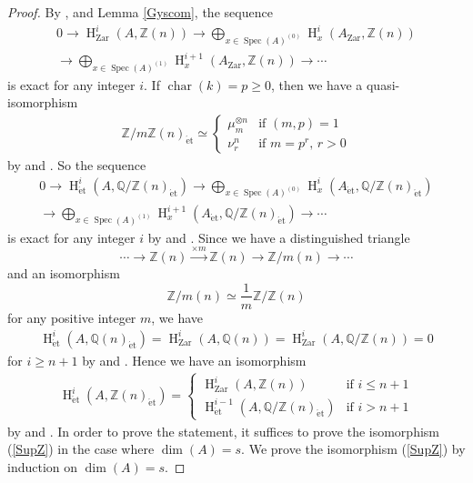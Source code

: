 \documentclass{article}
\newcommand{\spec}{\operatorname{Spec}}
\newcommand{\et}{\mathrm{\acute{e}t}}
\newcommand{\Zar}{\mathrm{Zar}}
\newcommand{\HO}{\operatorname{H}}
\begin{document}
%
\begin{proof}\upshape
By \cite[p.299, Theorem (10.1)]{B}, 
\cite[p.779, Theorem 3.2.b)]{Ge} and Lemma \ref{Gyscom},
the sequence
%
\begin{align}\label{GZarZ}
0
\to
\HO^{i}_{\Zar}(A, \mathbb{Z}(n))
\to
\displaystyle\bigoplus_{x\in \spec(A)^{(0)}}
\HO^{i}_{x}(A_{\Zar},
\mathbb{Z}(n)) \nonumber
\\
\to
\displaystyle\bigoplus_{x\in \spec(A)^{(1)}}
\HO^{i+1}_{x}(
A_{\Zar},
\mathbb{Z}(n)
) 
\to \cdots
\end{align}
%
is exact for any integer $i$.
If $\operatorname{char}(k)=p\geq 0$,
then we have a quasi-isomorphism
%
\begin{align*}
\mathbb{Z}/m\mathbb{Z}(n)_{\et}
\simeq
\left\{
%
\begin{array}{ll}
\mu_{m}^{\otimes n}
&  \textrm{if $(m, p)=1$}  \\ [5pt]
\nu_{r}^{n}
&  \textrm{if $m=p^{r}$, $r>0$}
\end{array}
%
\right.
\end{align*}
% 
by \cite[p.774, Theorem 1.2.4]{Ge} and
\cite[p.491, Theorem 8.3]{Ge-L}. 
So the sequence
%
\begin{align}\label{GetQZ}
0
\to
\HO^{i}_{\et}(A, \mathbb{Q}/\mathbb{Z}(n)_{\et}
)
\to
\displaystyle\bigoplus_{x\in \spec(A)^{(0)}}
\HO^{i}_{x}(A_{\et},
\mathbb{Q}/\mathbb{Z}(n)_{\et}
)  \nonumber
\\
\to 
\displaystyle\bigoplus_{x\in \spec(A)^{(1)}}
\HO^{i+1}_{x}(
A_{\et},
\mathbb{Q}/\mathbb{Z}(n)_{\et}
)  
\to \cdots
\end{align}
%
is exact for any integer $i$
by
\cite[Corollary 2.2.2]{C-H-K} and
\cite[p.600, Theorem 4.1]{Sh}.
Since we have
a distinguished triangle
%
\begin{equation*}
\cdots 
\to
\mathbb{Z}(n)
\xrightarrow{\times m}
\mathbb{Z}(n) 
\to
\mathbb{Z}/m(n) 
\to \cdots
\end{equation*}
%
and an isomorphism
%
\begin{equation*}
\mathbb{Z}/m(n)
\simeq 
\frac{1}{m}\mathbb{Z}/\mathbb{Z}(n)
\end{equation*}
%
for any positive integer $m$, 
we have
%
\begin{align*}
\HO^{i}_{\et}(A, \mathbb{Q}(n)_{\et})
=
\HO^{i}_{\Zar}(A, \mathbb{Q}(n))
=
\HO^{i}_{\Zar}(A, \mathbb{Q}/\mathbb{Z}(n))
=0
\end{align*}
%
for $i\geq n+1$
by \cite[p.781, Proposition 3.6]{Ge} 
and \cite[p.786, Corollary 4.4]{Ge}. Hence 
we have an isomorphism
%
\begin{align}\label{emcvs}
\HO^{i}_{\et}(
A,
\mathbb{Z}(n)_{\et}
)
=
\left\{
%
\begin{array}{ll}
\HO^{i}_{\Zar}(A,
\mathbb{Z}(n))
&  \textrm{if $i\leq n+1$}  \\ [5pt]
\HO^{i-1}_{\et}(
A,
\mathbb{Q}/\mathbb{Z}(n)_{\et}
)  
&  \textrm{if $i> n+1$}
\end{array}
%
\right.
\end{align}
% 
by \cite[p.774, Theorem 1.2.2]{Ge} and \cite{V2}. In order to prove the statement, it suffices to prove the isomorphism (\ref{SupZ})
in the case where $\operatorname{dim}(A)=s$.
We prove the isomorphism (\ref{SupZ}) by induction on $\operatorname{dim}(A)=s$.


\end{proof}
\end{document}
